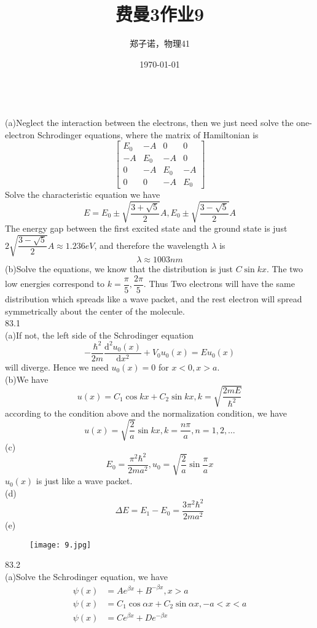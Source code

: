 \documentclass[utf8]{ctexart}
\title{费曼3作业9}
\author{郑子诺，物理41}
\date{\today}
\begin{document}
\maketitle
{}\\
(a)Neglect the interaction between the electrons, then we just need solve the one-electron Schrodinger equations, where the matrix of Hamiltonian is
\[\begin{bmatrix}
	E_0&-A&0&0\\
	-A&E_0&-A&0\\
	0&-A&E_0&-A\\
	0&0&-A&E_0
\end{bmatrix}\]
Solve the characteristic equation we have
\[E=E_0\pm\sqrt{\frac{3+\sqrt{5}}{2}}A,E_0\pm\sqrt{\frac{3-\sqrt{5}}{2}}A\]
The energy gap between the first excited state and the ground state is just $2\sqrt{\dfrac{3-\sqrt{5}}{2}}A\approx1.236\unit{eV}$, and therefore the wavelength $\lambda$ is
\[\lambda\approx1003\unit{nm}\]
(b)Solve the equations, we know that the distribution is just $C\sin kx$. The two low energies correspond to $k=\dfrac{\pi}{5},\dfrac{2\pi}{5}$. Thus Two electrons will have the same distribution which spreads like a wave packet, and the rest electron will spread symmetrically about the center of the molecule.\\
83.1\\
(a)If not, the left side of the Schrodinger equation
\[-\frac{\hbar^2}{2m}\frac{\mathrm{d^2}u_0(x)}{\mathrm{d}x^2}+V_0u_0(x)=Eu_0(x)\]
will diverge. Hence we need $u_0(x)=0$ for $x<0,x>a$.\\
(b)We have
\[u(x)=C_1\cos kx+C_2\sin kx,k=\sqrt{\frac{2mE}{\hbar^2}}\]
according to the condition above and the normalization condition, we have
\[u(x)=\sqrt{\frac{2}{a}}\sin kx,k=\frac{n\pi}{a},n=1,2,\dots\]
(c)
\[E_0=\frac{\pi^2\hbar^2}{2ma^2},u_0=\sqrt{\frac{2}{a}}\sin\frac{\pi}{a}x\]
$u_0(x)$ is just like a wave packet.\\
(d)
\[\Delta E=E_1-E_0=\frac{3\pi^2\hbar^2}{2ma^2}\]
(e)
\begin{figure}[H]
	\centering
	\texttt{[image: 9.jpg]}
\end{figure}
83.2\\
(a)Solve the Schrodinger equation, we have
\begin{align*}
	\psi(x)&=Ae^{\beta x}+B^{-\beta x},x>a\\
	\psi(x)&=C_1\cos\alpha x+C_2\sin\alpha x,-a<x<a\\
	\psi(x)&=Ce^{\beta x}+De^{-\beta x}
\end{align*}
\end{document}
